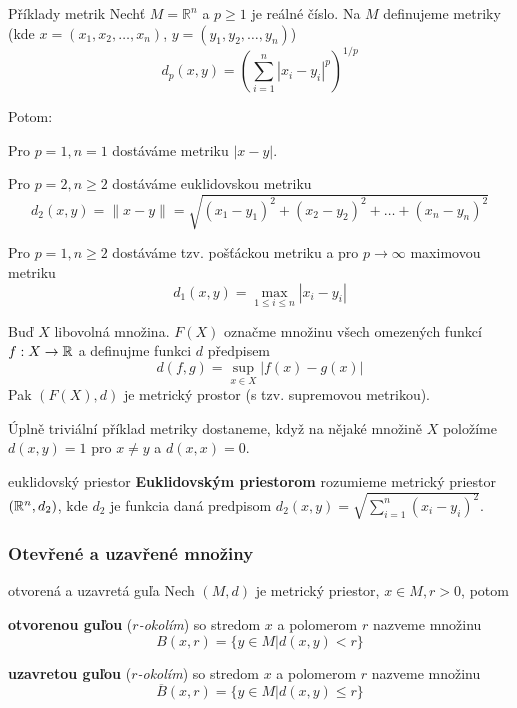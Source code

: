 \begin{obecne}{Příklady metrik}
Nechť $M = \mathbb{R}^n$ a $p \ge 1$ je reálné číslo. Na $M$ definujeme metriky\\(kde $x = (x_1, x_2, \dots, x_n)$, $y = (y_1, y_2, \dots , y_n)$)
$$d_p(x, y) = \left(\sum_{i=1}^{n}|x_i - y_i|^p\right)^{1/p}$$

\noindent Potom:\begin{penumerate}
\item Pro $p = 1, n = 1$ dostáváme metriku $|x − y|$.
\item Pro $p = 2, n \ge 2$ dostáváme euklidovskou metriku
$$d_2(x, y) = \parallel x − y \parallel = \sqrt{(x_1-y_1)^2+(x_2-y_2)^2+\dots+(x_n-y_n)^2}$$
\item Pro $p = 1, n \ge 2$ dostáváme tzv. pošťáckou metriku a pro $p \rightarrow \infty$ maximovou
metriku
$$d_1(x, y) = \max_{1 \le i \le n} |x_i − y_i|$$
\end{penumerate}
\par\medskip\noindent
Buď $X$ libovolná množina. $F(X)$ označme množinu všech omezených funkcí $f:X\to\mathbb{R}$ a definujme funkci $d$ předpisem
$$d(f,g)=\sup_{x\in X}|f(x)-g(x)|$$
Pak $(F(X),d)$ je metrický prostor (s tzv. supremovou metrikou).
\par\medskip\noindent
Úplně triviální příklad metriky dostaneme, když na nějaké množině $X$ položíme $d(x,y)=1$ pro $x\neq y$ a $d(x,x)=0$.
\end{obecne}

\begin{definiciaN}{euklidovský priestor}
\textbf{Euklidovským priestorom} rozumieme metrický priestor $(\mathbb{R}^n, d_2)$, kde $d_2$ je funkcia daná predpisom $d_2(x,y)=\sqrt{\sum_{i=1}^n(x_i-y_i)^2}$.
\end{definiciaN}

\subsubsection*{Otevřené a uzavřené množiny}

\begin{definiciaN}{otvorená a uzavretá guľa}
Nech $(M,d)$ je metrický priestor, $x \in M, r > 0$, potom
\begin{pitemize}
\item \textbf{otvorenou guľou} (\emph{$r$-okolím}) so stredom $x$ a polomerom $r$ nazveme množinu
$$B(x,r)=\{y \in M | d(x,y)<r\}$$
\item \textbf{uzavretou guľou} (\emph{$r$-okolím}) so stredom $x$ a polomerom $r$ nazveme množinu
$$\overline{B}(x,r) = \{y \in M | d(x,y) \le r \}$$
\end{pitemize}
\end{definiciaN}

